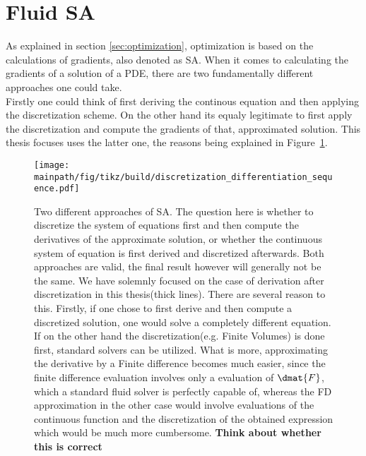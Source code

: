 \documentclass[../main.tex]{subfiles}
\begin{document}
\section{Fluid \acf{SA}}\label{sec:SA}
As explained in section \ref{sec:optimization}, optimization is based on the calculations of gradients, also denoted as \acf{SA}.
When it comes to calculating the gradients of a solution of a PDE, there are two fundamentally different approaches one could take.\\
Firstly one could think of first deriving the continous equation and then applying the discretization scheme. On the other hand its equaly legitimate to first apply the discretization and compute the gradients of that, approximated solution. This thesis focuses uses the latter one, the reasons being explained in Figure~\ref{fig:discretization_differentiation_sequence}.


 \begin{figure}[h!]
	\begin{center}
        \texttt{[image: \\mainpath/fig/tikz/build/discretization\_differentiation\_sequence.pdf]}
        \caption[Sensitivity Analysis approaches]{Two different approaches of \ac{SA}. The question here is whether to discretize the system of equations first and then compute the derivatives of the approximate solution, or whether the continuous system of equation is first derived and discretized afterwards. Both approaches are valid, the final result however will generally not be the same. We have solemnly focused on the case of derivation after discretization in this thesis(thick lines). There are several reason to this. Firstly, if one chose to first derive and then compute a discretized solution, one would solve a completely different equation. If on the other hand the discretization(e.g. Finite Volumes) is done first, standard solvers can be utilized. What is more, approximating the derivative by a Finite difference becomes much easier, since the finite difference evaluation involves only a evaluation of $\dmat{F}$, which a standard fluid solver is perfectly capable of, whereas the \ac{FD} approximation in the other case would involve evaluations of the continuous function and the discretization of the obtained expression which would be much more cumbersome. \textbf{Think about whether this is correct} }
		\label{fig:discretization_differentiation_sequence}
    \end{center}
\end{figure}
\end{document}
